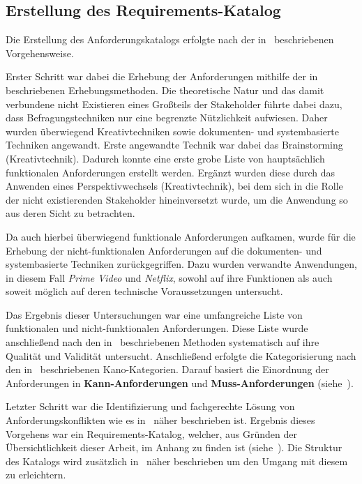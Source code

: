 \subsection{Erstellung des Requirements-Katalog}\label{subsec:requirements}
Die Erstellung des Anforderungskatalogs erfolgte nach der in~ beschriebenen Vorgehensweise.

Erster Schritt war dabei die Erhebung der Anforderungen mithilfe der in~ beschriebenen
Erhebungsmethoden.
Die theoretische Natur und das damit verbundene nicht Existieren eines Großteils der Stakeholder führte dabei dazu, dass
Befragungstechniken nur eine begrenzte Nützlichkeit aufwiesen.
Daher wurden überwiegend Kreativtechniken sowie dokumenten- und systembasierte Techniken angewandt.
Erste angewandte Technik war dabei das Brainstorming (Kreativtechnik).
Dadurch konnte eine erste grobe Liste von hauptsächlich funktionalen Anforderungen erstellt werden.
Ergänzt wurden diese durch das Anwenden eines Perspektivwechsels (Kreativtechnik),
bei dem sich in die Rolle der nicht existierenden Stakeholder hineinversetzt wurde,
um die Anwendung so aus deren Sicht zu betrachten.

Da auch hierbei überwiegend funktionale Anforderungen aufkamen, wurde für die Erhebung der nicht-funktionalen Anforderungen
auf die dokumenten- und systembasierte Techniken zurückgegriffen.
Dazu wurden verwandte Anwendungen, in diesem Fall \textit{Prime Video} und \textit{Netflix}, sowohl auf ihre Funktionen als auch
soweit möglich auf deren technische Voraussetzungen untersucht.

Das Ergebnis dieser Untersuchungen war eine umfangreiche Liste von funktionalen und nicht-funktionalen Anforderungen.
Diese Liste wurde anschließend nach den in~ beschriebenen
Methoden systematisch auf ihre Qualität und Validität untersucht.
Anschließend erfolgte die Kategorisierung nach den in~ beschriebenen Kano-Kategorien.
Darauf basiert die Einordnung der Anforderungen in \textbf{Kann-Anforderungen} und \textbf{Muss-Anforderungen}
(siehe~).

Letzter Schritt war die Identifizierung und fachgerechte Lösung von Anforderungskonflikten wie es in~
näher beschrieben ist.
Ergebnis dieses Vorgehens war ein Requirements-Katalog, welcher, aus Gründen der Übersichtlichkeit dieser Arbeit, im Anhang
zu finden ist (siehe~).
Die Struktur des Katalogs wird zusätzlich in~ näher beschrieben um den Umgang mit diesem zu
erleichtern.

